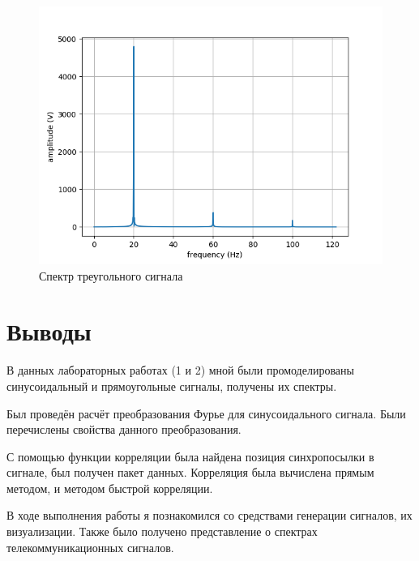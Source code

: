 \begin{figure}[H]
	\begin{center}
		\includegraphics[scale=0.7]{../out/triangle_freq.png}
		\caption{Спектр треугольного сигнала} 
		\label{pic:trinagle_freq} %
	\end{center}
\end{figure}


\newpage
\section{Выводы}
В данных лабораторных работах (1 и 2) мной были промоделированы синусоидальный и прямоугольные сигналы, получены их спектры.

Был проведён расчёт преобразования Фурье для синусоидального сигнала. Были перечислены свойства данного преобразования.

С помощью функции корреляции была найдена позиция синхропосылки в сигнале, был получен пакет данных. Корреляция была вычислена прямым методом, и методом быстрой корреляции.

В ходе выполнения работы я познакомился со средствами генерации сигналов, их визуализации. Также было получено представление о спектрах телекоммуникационных сигналов.

